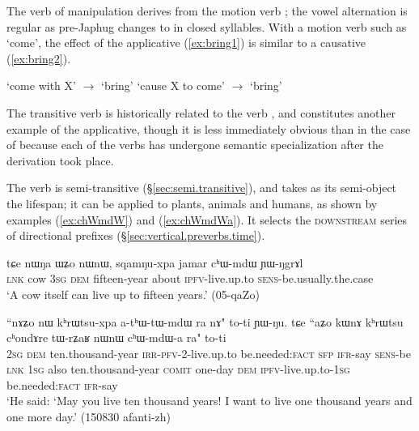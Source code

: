 The verb of manipulation  derives from the motion verb ; the vowel alternation is regular as pre-Japhug  changes to  in closed syllables. With a motion verb such as `come', the effect of the applicative (\ref{ex:bring1}) is similar to a causative  (\ref{ex:bring2}). 

\begin{exe}
\ex \label{ex:bring1}
\glt `come with X' $\rightarrow$ `bring'
\ex \label{ex:bring2}
\glt `cause X to come' $\rightarrow$ `bring'
\end{exe}

The transitive verb  is historically related to the verb , and constitutes another example of the  applicative, though it is less immediately obvious than in the case of  because each of the verbs has undergone semantic specialization after the derivation took place.

The verb  is semi-transitive (§\ref{sec:semi.transitive}), and takes as its semi-object the lifespan; it can be applied to plants, animals and humans, as shown by examples (\ref{ex:chWmdW}) and (\ref{ex:chWmdWa}). It selects the \textsc{downstream} series of directional prefixes (§\ref{sec:vertical.preverbs.time}).

 \begin{exe}
\ex \label{ex:chWmdW}
\gll tɕe nɯŋa ɯʑo nɯnɯ, sqamŋu-xpa jamar cʰɯ-mdɯ ɲɯ-ŋgrɤl\\
\textsc{lnk} cow \textsc{3sg} \textsc{dem} fifteen-year about \textsc{ipfv}-live.up.to \textsc{sens}-be.usually.the.case \\
\glt `A cow itself can live up to fifteen years.' (05-qaZo)
\end{exe}

 \begin{exe}
\ex \label{ex:chWmdWa}
\gll ``nɤʑo nɯ kʰrɯtsu-xpa a-tʰɯ-tɯ-mdɯ ra nɤ" to-ti ɲɯ-ŋu. tɕe ``aʑo kɯnɤ kʰrɯtsu cʰondɤre tɯ-rʑaʁ nɯnɯ cʰɯ-mdɯ-a ra" to-ti \\
\textsc{2sg} \textsc{dem} ten.thousand-year \textsc{irr}-\textsc{pfv}-2-live.up.to be.needed:\textsc{fact} \textsc{sfp} \textsc{ifr}-say \textsc{sens}-be \textsc{lnk} \textsc{1sg} also  ten.thousand-year \textsc{comit} one-day \textsc{dem} \textsc{ipfv}-live.up.to-\textsc{1sg} be.needed:\textsc{fact} \textsc{ifr}-say \\
\glt `He said: `May you live ten thousand years! I want to live one thousand years and one more day.' (150830 afanti-zh)
\end{exe}

